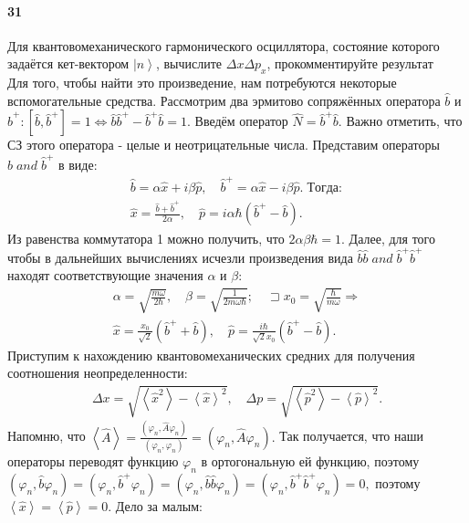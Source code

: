 


	\paragraph{31}
	Для квантовомеханического гармонического осциллятора, состояние которого задаётся кет-вектором $\left|n\right\rangle$, вычислите $\Delta x\Delta p_x$, прокомментируйте результат\\
	
	Для того, чтобы найти это произведение, нам потребуются некоторые вспомогательные средства. Рассмотрим два эрмитово сопряжённых оператора $\hat{b}$ и $\hat{b}^+: \left[\hat{b},\hat{b}^+\right]=1 \Leftrightarrow \hat{b}\hat{b}^+-\hat{b}^+\hat{b}=1.$ Введём оператор $\hat{N}=\hat{b}^+\hat{b}.$ Важно отметить, что СЗ этого оператора - целые и неотрицательные числа.
	Представим операторы $\hat{b}\;and\;\hat{b}^+$ в виде:
	\begin{gather*}
	\hat{b}=\alpha\hat{x}+i\beta\hat{p},\quad
	\hat{b}^+=\alpha\hat{x}-i\beta\hat{p}.\; Тогда:\\
	\hat{x}=\frac{\hat{b}+\hat{b}^+}{2\alpha},\quad
	\hat{p}=i\alpha\hbar\left(\hat{b}^+-\hat{b}\right).
	\end{gather*}
	Из равенства коммутатора 1 можно получить, что $2\alpha\beta\hbar=1.$ Далее, для того чтобы в дальнейших вычислениях исчезли произведения вида $\hat{b}\hat{b}\;and\;\hat{b}^+\hat{b}^+$ находят соответствующие значения $α$ и $β$:
	\begin{gather*}
	\alpha=\sqrt{\frac{m\omega}{2\hbar}},\quad\beta=\sqrt{\frac{1}{2m\omega\hbar}};\quad\sqsupset x_0=\sqrt{\frac{\hbar}{m\omega}}\Rightarrow\\
	\hat{x}=\frac{x_0}{\sqrt{2}}\left(\hat b^++\hat b\right),\quad \hat p=\frac{i\hbar}{\sqrt{2}x_0}\left(\hat b^+-\hat b\right).
	\end{gather*}
	Приступим к нахождению квантовомеханических средних для получения соотношения неопределенности:
	\begin{gather*}
	\Delta x=\sqrt{\left<\hat x^2\right>-\left<\hat x\right>^2},\quad
	\Delta p=\sqrt{\left<\hat p^2\right>-\left<\hat p\right>^2}.
	\end{gather*}
	Напомню, что $\left<\hat A\right>=\frac{\left(\varphi_n,\hat A\varphi_n\right)}{\left(\varphi_n,\varphi_n\right)}=\left(\varphi_n,\hat A\varphi_n\right).$ Так получается, что наши операторы переводят функцию $\varphi_n$ в ортогональную ей функцию, поэтому $(\varphi_n,\hat b\varphi_n)=(\varphi_n,\hat b^+\varphi_n)=(\varphi_n,\hat b\hat b\varphi_n)=(\varphi_n,\hat b^+\hat b^+\varphi_n)=0,$ поэтому $\left<\hat x\right>=\left<\hat p\right>=0.$ Дело за малым:

